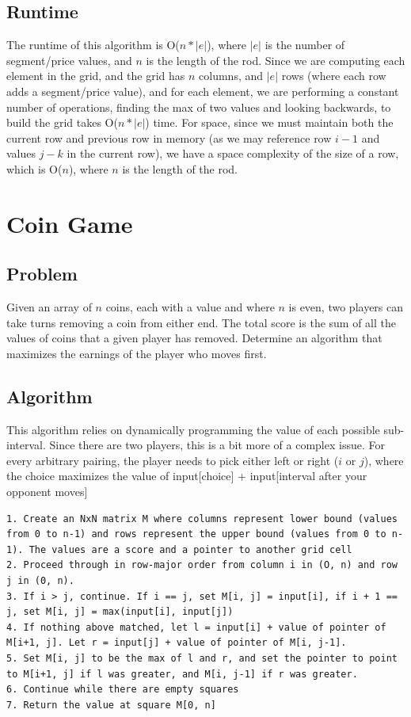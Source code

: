 \documentclass[titlepage]{article}
\numberwithin{equation}{subsection}
\begin{document}
\subsection{Runtime}
The runtime of this algorithm is O($n*|e|$), where $|e|$ is the number of segment/price values, and $n$ is the length of the rod. Since we
are computing each element in the grid, and the grid has $n$ columns, and $|e|$ rows (where each row adds a segment/price value), and for each
element, we are performing a constant number of operations, finding the max of two values and looking backwards, to build the grid takes O($n*|e|$)
time. For space, since we must maintain both the current row and previous row in memory (as we may reference row $i-1$ and values $j-k$ in the
current row), we have a space complexity of the size of a row, which is O($n$), where $n$ is the length of the rod.

\section{Coin Game}
\subsection{Problem}
Given an array of $n$ coins, each with a value and where $n$ is even, two players can take turns removing a coin from either end.
The total score is the sum of all the values of coins that a given player has removed. Determine an algorithm that maximizes the
earnings of the player who moves first.
\subsection{Algorithm}
This algorithm relies on dynamically programming the value of each possible sub-interval. Since there are two players, this is a bit more
of a complex issue. For every arbitrary pairing, the player needs to pick either left or right ($i$ or $j$), where the choice maximizes
the value of input[choice] + input[interval after your opponent moves]
\begin{lstlisting}
1. Create an NxN matrix M where columns represent lower bound (values from 0 to n-1) and rows represent the upper bound (values from 0 to n-1). The values are a score and a pointer to another grid cell
2. Proceed through in row-major order from column i in (O, n) and row j in (0, n). 
3. If i > j, continue. If i == j, set M[i, j] = input[i], if i + 1 == j, set M[i, j] = max(input[i], input[j])
4. If nothing above matched, let l = input[i] + value of pointer of M[i+1, j]. Let r = input[j] + value of pointer of M[i, j-1].
5. Set M[i, j] to be the max of l and r, and set the pointer to point to M[i+1, j] if l was greater, and M[i, j-1] if r was greater.
6. Continue while there are empty squares
7. Return the value at square M[0, n]
\end{lstlisting}
\end{document}
